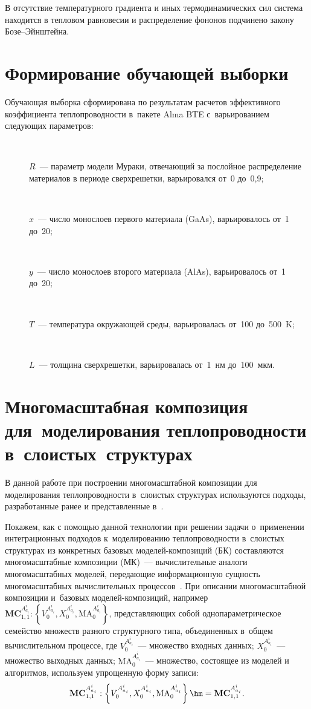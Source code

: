 \begin{multicols}{2}
    В отсутствие температурного градиента и иных термодинамических сил 
система находится в тепловом равновесии и распределение фононов подчинено 
закону Бо\-зе--Эйн\-штейна.

\section{Формирование обучающей выборки}

    Обучающая выборка сформирована по результатам расчетов эффективного 
коэффициента теплопроводности в~пакете Alma BTE с~варьированием 
следующих параметров:
    \begin{description}
    \item[\,] $R$~--- параметр модели Мураки, отвечающий за послойное 
распределение материалов в периоде сверхрешетки, варьировался от~0 до~0,9;
\item[\,] $x$~--- число монослоев первого материала (GaAs), варьировалось 
от~1 до~20;
\item[\,] $y$~--- число монослоев второго материала (AlAs), варьировалось 
от~1 до~20;
\item[\,] $T$~--- температура окружающей среды, варьировалась от~100 
до~500~K;
\item[\,] $L$~--- толщина сверхрешетки, варьировалась от~1~нм до~100~мкм. 
\end{description}

\section{Многомасштабная композиция для~моделирования 
теплопроводности в~слоистых~структурах}

    В данной работе при построении многомасштабной композиции для 
моделирования теплопроводности в~слоистых структурах используются 
подходы, разработанные ранее и представленные в~\cite{3-ab, 4-ab}.
     
    Покажем, как с помощью данной технологии при решении задачи 
    о~применении интеграционных подходов к~моделированию теплопроводности 
    в~слоистых структурах из конкретных базовых  
мо\-де\-лей-ком\-по\-зи\-ций (БК) составляются многомасштабные композиции 
(МК)~--- вычислительные аналоги многомасштабных моделей, передающие 
информационную сущность многомасштабных вычислительных  
процессов~\cite{3-ab, 4-ab}. При описании многомасштабной композиции и~базовых  
мо\-де\-лей-ком\-по\-зи\-ций, например $\mathbf{MC}_{1,1}^{A^i_{a_i}}: 
\left\{ V_0^{A^i_{a_i}}, X_0^{A^i_{a_i}}, \mathrm{MA}_0^{A^i_{a_i}}\right\}$, 
представляющих собой однопараметрическое семейство множеств разного 
структурного типа, объединенных в~общем вы\-чис\-ли\-тель\-ном процессе, где 
$V_0^{A^i_{a_i}}$~--- множество входных данных; 
$X_0^{A^i_{a_i}}$~--- множество выходных данных; $\mathrm{MA}_0^{A^i_{a_i}}$~--- 
множество, состоящее из моделей и алгоритмов, используем упрощенную 
форму записи: 
    $$
    \mathbf{MC}_{1,1}^{A^i_{a_i}}: \left\{ V_0^{A^i_{a_i}}, 
X_0^{A^i_{a_i}}, \mathrm{MA}_0^{A^i_{a_i}}\right\}\hm= 
\mathbf{MC}_{1,1}^{A^i_{a_i}}.
$$
    

\end{multicols}
